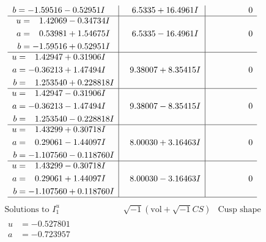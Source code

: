 \documentclass[1p]{elsarticle_modified}
\theoremstyle{definition}
\newcommand{\I}{\sqrt{-1}}
\begin{document}
$$\begin{array}{c|c|c}
\begin{aligned}
b &= -1.59516 - 0.52951 I\end{aligned}
 & \phantom{-}6.5335 + 16.4961 I & \phantom{-0.000000 } 0 \\ \hline\begin{aligned}
u &= \phantom{-}1.42069 - 0.34734 I \\
a &= \phantom{-}0.53981 + 1.54675 I \\
b &= -1.59516 + 0.52951 I\end{aligned}
 & \phantom{-}6.5335 - 16.4961 I & \phantom{-0.000000 } 0 \\ \hline\begin{aligned}
u &= \phantom{-}1.42947 + 0.31906 I \\
a &= -0.36213 + 1.47494 I \\
b &= \phantom{-}1.253540 + 0.228818 I\end{aligned}
 & \phantom{-}9.38007 + 8.35415 I & \phantom{-0.000000 } 0 \\ \hline\begin{aligned}
u &= \phantom{-}1.42947 - 0.31906 I \\
a &= -0.36213 - 1.47494 I \\
b &= \phantom{-}1.253540 - 0.228818 I\end{aligned}
 & \phantom{-}9.38007 - 8.35415 I & \phantom{-0.000000 } 0 \\ \hline\begin{aligned}
u &= \phantom{-}1.43299 + 0.30718 I \\
a &= \phantom{-}0.29061 - 1.44097 I \\
b &= -1.107560 - 0.118760 I\end{aligned}
 & \phantom{-}8.00030 + 3.16463 I & \phantom{-0.000000 } 0 \\ \hline\begin{aligned}
u &= \phantom{-}1.43299 - 0.30718 I \\
a &= \phantom{-}0.29061 + 1.44097 I \\
b &= -1.107560 + 0.118760 I\end{aligned}
 & \phantom{-}8.00030 - 3.16463 I & \phantom{-0.000000 } 0\\
 \hline 
 \end{array}$$\newpage$$\begin{array}{c|c|c}  
\text{Solutions to }I^u_{1}& \I (\text{vol} + \sqrt{-1}CS) & \text{Cusp shape}\\
 \hline 
\begin{aligned}
u &= -0.527801\phantom{ +0.000000I} \\
a &= -0.723957\phantom{ +0.000000I} \\

\end{aligned}
\end{array}$$
\end{document}
